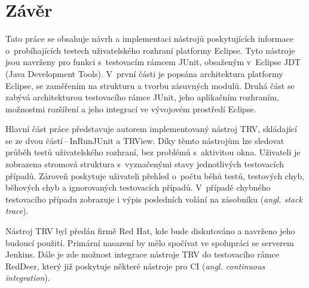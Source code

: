 \chapter{Závěr}                                                           %
Tato práce se obsahuje návrh a implementaci nástrojů poskytujících informace o~probíhajících testech uživatelského rozhraní platformy Eclipse. Tyto nástroje  jsou navrženy pro funkci s~testovacím rámcem JUnit, obsaženým v~Eclipse JDT (Java Development Tools). V~první části je popsána architektura platformy Eclipse, se zaměřením na strukturu a tvorbu zásuvných modulů. Druhá část se zabývá architekturou testovacího rámce JUnit, jeho aplikačním rozhraním, možnostmi rozšíření a jeho integrací ve vývojovém prostředí Eclipse.

Hlavní část práce představuje autorem implementovaný nástroj TRV, skládající se ze dvou částí\,--\,InRunJUnit a TRView. Díky těmto nástrojům lze sledovat průběh testů uživatelského rozhraní, bez problémů s~aktivitou okna. Uživateli je zobrazena stromová struktura s~vyznačenými stavy jednotlivých testovacích případů. Zároveň poskytuje uživateli přehled o~počtu běhů testů, testových chyb, běhových chyb a ignorovaných testovacích případů. V~případě chybného testovacího případu zobrazuje i výpis posledních volání na zásobníku (\emph{angl. stack trace}).

Nástroj TRV byl předán firmě Red Hat, kde bude diskutováno a navrženo jeho budoucí použití. Primární nasazení by mělo spočívat ve spolupráci se serverem Jenkins. Dále je zde možnost integrace nástroje TRV do testovacího rámce RedDeer, který již poskytuje některé nástroje pro CI (\emph{angl. continuous integration}).